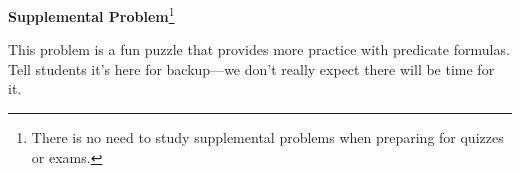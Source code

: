 \documentclass[handout]{mcs}
\begin{document}



\begin{center}
\textbf{Supplemental Problem}\footnote{There is no need to study supplemental
  problems when preparing for quizzes or exams.}
\end{center}

\begin{staffnotes}
This problem is a fun puzzle that provides more practice with
predicate formulas.  Tell students it's here for backup---we don't
really expect there will be time for it.
\end{staffnotes}


\iffalse
\pinput{CP_variable_convention}
\pinput{PS_predicate_calculus_power_of_two}
\pinput{PS_6042_staff_cabal}
\pinput{FP_logic_of_leq}
\pinput{CP_logic_news_network}  %
\pinput{PS_emailed_exactly_2_others}  %
\pinput{PS_express_in_predicate_form}
\pinput{PS_express_predicates_in_formal_logic_notation}
\pinput{PS_predicate_calculus_power_of_prime}  %
\pinput{PS_predicate_calculus_power_of_two}
\pinput{PS_rewrite_assertions_prime_goldbach_bertrand_fermat}
\pinput{PS_translate_to_predicate_logic}
\pinput{CP_a_season_for_every_purpose}   %
\fi

\end{document}
